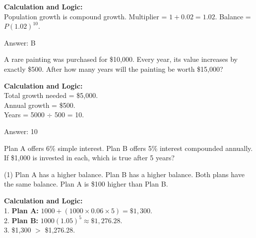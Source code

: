 \documentclass[11pt,paper=a4,answers]{exam}
\begin{document}
\begin{questions}
\begin{solution}
\textbf{Calculation and Logic:} \\
Population growth is compound growth. Multiplier = $1 + 0.02 = 1.02$. Balance = $P(1.02)^{10}$.

\vspace{30pt}

Answer: \colorbox{yellow!100}{B}
\end{solution}

\vspace{60pt}

\question
A rare painting was purchased for \$10,000. Every year, its value increases by exactly \$500. After how many years will the painting be worth \$15,000?

\begin{solution}
\textbf{Calculation and Logic:} \\
Total growth needed = \$5,000. \\
Annual growth = \$500. \\
Years = 5000 $\div$ 500 = 10.

\vspace{30pt}

Answer: \colorbox{yellow!100}{10}
\end{solution}

\vspace{60pt}

\question
Plan A offers 6\% simple interest. Plan B offers 5\% interest compounded annually. If \$1,000 is invested in each, which is true after 5 years?
\begin{tasks}(1)
    \task Plan A has a higher balance.
    \task Plan B has a higher balance.
    \task Both plans have the same balance.
    \task Plan A is \$100 higher than Plan B.
\end{tasks}

\begin{solution}
\textbf{Calculation and Logic:} \\
1. \textbf{Plan A:} $1000 + (1000 \times 0.06 \times 5) = \$1,300$. \\
2. \textbf{Plan B:} $1000(1.05)^5 \approx \$1,276.28$. \\
3. \$1,300 $>$ \$1,276.28.

\vspace{30pt}


\end{solution}
\end{questions}
\end{document}
